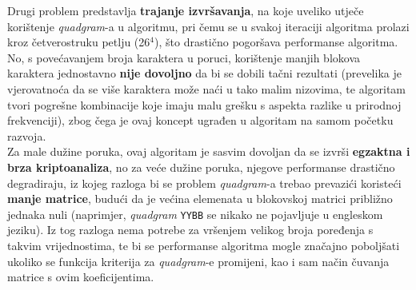 \documentclass[12pt, a4paper]{article}
\begin{document}
Drugi problem predstavlja \textbf{trajanje izvršavanja}, na koje uveliko utječe korištenje \textit{quadgram}-a u algoritmu, pri čemu se u svakoj iteraciji algoritma prolazi kroz četverostruku petlju (26$^4$), što drastično pogoršava performanse algoritma. No, s povećavanjem broja karaktera u poruci, korištenje manjih blokova karaktera jednostavno \textbf{nije dovoljno} da bi se dobili tačni rezultati (prevelika je vjerovatnoća da se više karaktera može naći u tako malim nizovima, te algoritam tvori pogrešne kombinacije koje imaju malu grešku s aspekta razlike u prirodnoj frekvenciji), zbog čega je ovaj koncept ugrađen u algoritam na samom početku razvoja. \\

Za male dužine poruka, ovaj algoritam je sasvim dovoljan da se izvrši \textbf{egzaktna i brza kriptoanaliza}, no za veće dužine poruka, njegove performanse drastično degradiraju, iz kojeg razloga bi se problem \textit{quadgram}-a trebao prevazići koristeći \textbf{manje matrice}, budući da je većina elemenata u blokovskoj matrici približno jednaka nuli (naprimjer, \textit{quadgram} \texttt{YYBB} se nikako ne pojavljuje u engleskom jeziku). Iz tog razloga nema potrebe za vršenjem velikog broja poređenja s takvim vrijednostima, te bi se performanse algoritma mogle značajno poboljšati ukoliko se funkcija kriterija za \textit{quadgram}-e promijeni, kao i sam način čuvanja matrice s ovim koeficijentima.

\newpage



\end{document}
